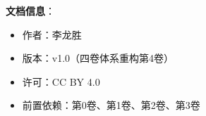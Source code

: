 \documentclass[11pt,a4paper]{article}
\begin{document}
\vspace{5mm}
\noindent\textbf{文档信息}：
\begin{itemize}
    \item 作者：李龙胜
    \item 版本：v1.0（四卷体系重构第4卷）
    \item 许可：CC BY 4.0
    \item 前置依赖：第0卷、第1卷、第2卷、第3卷
\end{itemize}
\end{document}
